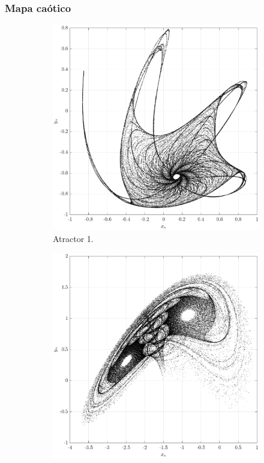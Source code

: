 \documentclass[10pt]{beamer}
\begin{document}
\begin{frame}
    \frametitle{Mapa caótico}
	\begin{figure}[hbtp]
            \centering
            \caption{Diferentes atractores caóticos del mapa bidimensional $A_{1}$ y $A_{2}$.} 
            \begin{subfigure}[b]{0.475\textwidth}
                \centering
                \includegraphics[width=\textwidth,trim=70 0 70 0,clip]{G1_map1}
                \caption{Atractor 1.}    
                \label{fig:mapa_1}
            \end{subfigure}
            \hfill
            \begin{subfigure}[b]{0.475\textwidth}  
                \centering 
                \includegraphics[width=\textwidth,trim=70 0 70 0,clip]{G2_map2}

\end{subfigure}
\end{figure}
\end{frame}
\end{document}
